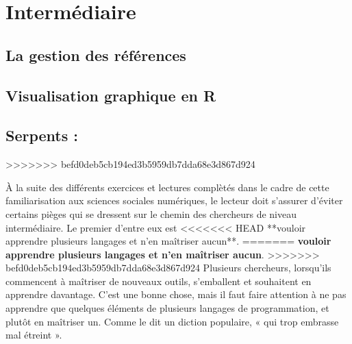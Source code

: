 \documentclass[
  letterpaper,
]{scrbook}
\begin{document}
\hypertarget{intermuxe9diaire}{%
\section{Intermédiaire}\label{intermuxe9diaire}}

\hypertarget{la-gestion-des-ruxe9fuxe9rences}{%
\subsection{La gestion des
références}\label{la-gestion-des-ruxe9fuxe9rences}}

\hypertarget{visualisation-graphique-en-r}{%
\subsection{Visualisation graphique en
R}\label{visualisation-graphique-en-r}}

\hypertarget{serpents-1}{%
\subsection{Serpents :}\label{serpents-1}}
>>>>>>> befd0deb5cb194ed3b5959db7dda68e3d867d924

À la suite des différents exercices et lectures complètés dans le cadre
de cette familiarisation aux sciences sociales numériques, le lecteur
doit s'assurer d'éviter certains pièges qui se dressent sur le chemin
des chercheurs de niveau intermédiaire. Le premier d'entre eux est
<<<<<<< HEAD
**vouloir apprendre plusieurs langages et n'en maîtriser aucun**.
=======
\textbf{vouloir apprendre plusieurs langages et n'en maîtriser aucun}.
>>>>>>> befd0deb5cb194ed3b5959db7dda68e3d867d924
Plusieurs chercheurs, lorsqu'ils commencent à maîtriser de nouveaux
outils, s'emballent et souhaitent en apprendre davantage. C'est une
bonne chose, mais il faut faire attention à ne pas apprendre que
quelques éléments de plusieurs langages de programmation, et plutôt en
maîtriser un. Comme le dit un diction populaire, « qui trop embrasse mal
étreint ».
\end{document}
